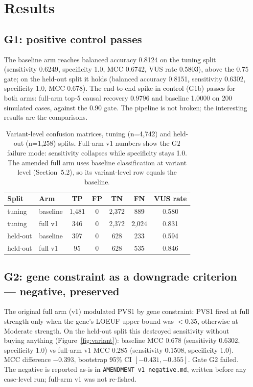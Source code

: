 \documentclass[11pt]{article}
\newcommand{\toprule}{\hline}
\newcommand{\midrule}{\hline}
\newcommand{\bottomrule}{\hline}
\begin{document}
\section{Results}
\subsection{G1: positive control passes}
The baseline arm reaches balanced accuracy 0.8124 on the tuning split (sensitivity
0.6249, specificity 1.0, MCC 0.6742, VUS rate 0.5803), above the 0.75 gate; on the
held-out split it holds (balanced accuracy 0.8151, sensitivity 0.6302, specificity
1.0, MCC 0.678). The end-to-end spike-in control (G1b) passes for both arms:
full-arm top-5 causal recovery 0.9796 and baseline 1.0000 on 200 simulated cases,
against the 0.90 gate. The pipeline is not broken; the interesting results are the
comparisons.

\begin{table}[tb!]
\centering\small
\caption{Variant-level confusion matrices, tuning (n=4,742) and held-out (n=1,258)
splits. Full-arm v1 numbers show the G2 failure mode: sensitivity collapses while
specificity stays 1.0. The amended full arm uses baseline classification at variant
level (Section~5.2), so its variant-level row equals the baseline.}
\label{tab:conf}
\begin{tabular}{llccccc}
\toprule
Split & Arm & TP & FP & TN & FN & VUS rate \\
\midrule
tuning & baseline & 1,481 & 0 & 2,372 & 889 & 0.580 \\
tuning & full v1 & 346 & 0 & 2,372 & 2,024 & 0.831 \\
held-out & baseline & 397 & 0 & 628 & 233 & 0.594 \\
held-out & full v1 & 95 & 0 & 628 & 535 & 0.846 \\
\bottomrule
\end{tabular}
\end{table}

\subsection{G2: gene constraint as a downgrade criterion --- negative, preserved}
\label{sec:g2}
The original full arm (v1) modulated PVS1 by gene constraint: PVS1 fired at full
strength only when the gene's LOEUF upper bound was $< 0.35$, otherwise at Moderate
strength. On the held-out split this destroyed sensitivity without buying anything
(Figure~\ref{fig:variant}): baseline MCC 0.678 (sensitivity 0.6302, specificity 1.0)
vs full-arm v1 MCC 0.285 (sensitivity 0.1508, specificity 1.0). MCC difference
$-0.393$, bootstrap 95\% CI $[-0.431, -0.355]$. Gate G2 failed. The negative is
reported as-is in \texttt{AMENDMENT\_v1\_negative.md}, written before any case-level
run; full-arm v1 was not re-fished.
\end{document}
